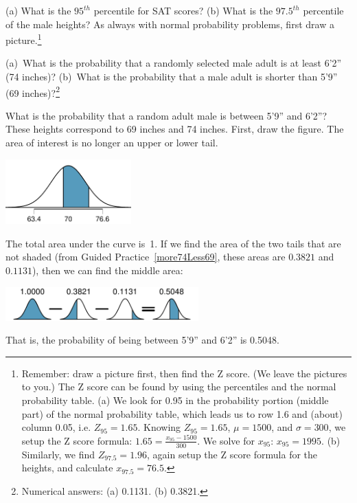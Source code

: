 \begin{exercise}
(a) What is the $95^{th}$ percentile for SAT scores? (b) What is the $97.5^{th}$ percentile of the male heights? As always with normal probability problems, first draw a picture.\footnote{Remember: draw a picture first, then find the Z score. (We leave the pictures to you.) The Z score can be found by using the percentiles and the normal probability table. (a) We look for 0.95 in the probability portion (middle part) of the normal probability table, which leads us to row 1.6 and (about) column 0.05, i.e. $Z_{95}=1.65$. Knowing $Z_{95}=1.65$, $\mu = 1500$, and $\sigma = 300$, we setup the Z score formula: $1.65 = \frac{x_{95} - 1500}{300}$. We solve for $x_{95}$: $x_{95} = 1995$. (b) Similarly, we find $Z_{97.5} = 1.96$, again setup the Z score formula for the heights, and calculate $x_{97.5} = 76.5$.}
\end{exercise}

\begin{exercise}\label{more74Less69}
(a)~What is the probability that a randomly selected male adult is at least 6'2'' (74 inches)? (b)~What is the probability that a male adult is shorter than 5'9'' (69 inches)?\footnote{Numerical answers: (a) 0.1131. (b) 0.3821.}
\end{exercise}

\begin{example}{What is the probability that a random adult male is between 5'9'' and 6'2''?}
These heights correspond to 69 inches and 74 inches. First, draw the figure. The area of interest is no longer an upper or lower tail.\vspace{-3mm}
\begin{center}
\includegraphics[height=25mm]{02/figures/between59And62/between59And62}\vspace{-1mm}
\end{center}
The total area under the curve is~1. If we find the area of the two tails that are not shaded (from Guided Practice~\ref{more74Less69}, these areas are $0.3821$ and $0.1131$), then we can find the middle area:\vspace{-3mm}
\begin{center}
\includegraphics[height=13mm]{02/figures/subtracting2Areas/subtracting2Areas}\vspace{-1mm}
\end{center}
That is, the probability of being between 5'9'' and 6'2'' is 0.5048.
\end{example}


